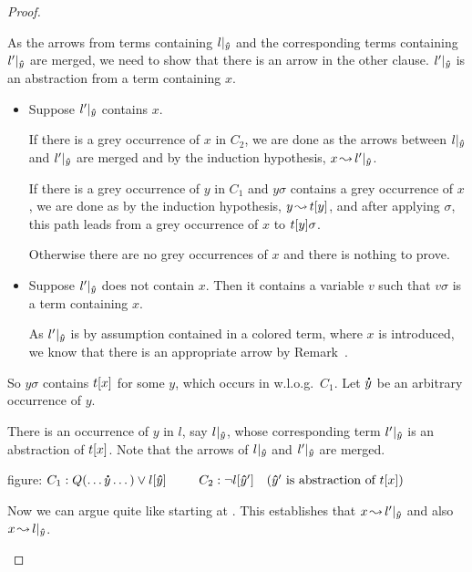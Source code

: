 \documentclass[,%
	paper=a4,%
	DIV11, %
	twoside=false,%
	liststotoc,
	bibtotoc,
	draft=false,%
	numbers=noendperiod
]{scrartcl}
\begin{document}
{\begin{proof}
\begin{description}
\begin{itemize}
					As the arrows from terms containing $l|_{\bm\hat y}$ and the corresponding terms containing $l'|_{\bm\hat y}$ are merged, we need to show that there is an arrow in the other clause. $l'|_{\bm\hat y}$ is an abstraction from a term containing $x$.

					\markC
					\begin{itemize}
						\item 
							Suppose $l'|_{\bm\hat y}$ contains $x$. 

							If there is a grey occurrence of $x$ in $C_2$, we are done as the arrows between $l|_{\bm\hat y}$ and $l'|_{\bm\hat y}$ are merged and by the induction hypothesis, $x \operatorname{\leadsto} l'|_{\bm\hat y}$.

							If there is a grey occurrence of $y$ in $C_1$ and $y\sigma$ contains a grey occurrence of $x$, we are done as by the induction hypothesis, $y \operatorname{\leadsto} t[y]$,
							and after applying $\sigma$, this path leads from a grey occurrence of $x$ to $t[y]\sigma$.

							Otherwise there are no grey occurrences of $x$ and there is nothing to prove.

						\item 
							Suppose $l'|_{\bm\hat y}$ does not contain $x$.
							Then it contains a variable $v$ such that $v\sigma$ is a term containing $x$.


							As $l'|_{\bm\hat y}$ is by assumption contained in a colored term, where $x$ is introduced, we know that there is an appropriate arrow by Remark~\substremarkref.


					\end{itemize}
			\end{itemize}

		\item [Suppose a term containing $t\occ{x}$ with $t$ colored is in $\ran(\sigma)$.]
			So $y\sigma$ contains $t\occ{x}$ for some $y$, which occurs in w.l.o.g.\ $C_1$.
			Let $\bm\dot y$ be an arbitrary occurrence of $y$.

			There is an occurrence of $y$ in $l$, say $l|_{\bm\hat y}$, whose corresponding term $l'|_{\bm\hat y}$ is an abstraction of $t\occ{x}$. Note that the arrows of $l|_{\bm\hat y}$ and $l'|_{\bm\hat y}$ are merged.

			figure:
			$C_1: Q(\dots \bdot y \dots) \lor l\occ{\bhat y}\quad\quad$
			$C_2: \lnot l[\bm\hat y']\quad(\bm\hat y' \text{ is abstraction of } t[x])$

			Now we can argue quite like starting at \markC.
			This establishes that $x \operatorname{\leadsto} l'|_{\bm\hat y}$ and also $x \operatorname{\leadsto} l|_{\bm\hat y}$.


\end{description}
\end{proof}}
\end{document}

